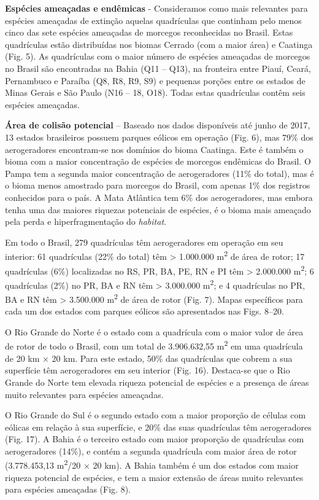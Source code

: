 \documentclass[
]{scrbook}
\begin{document}
\textbf{Espécies ameaçadas e endêmicas} - Consideramos como mais relevantes para espécies ameaçadas de extinção aquelas quadrículas que continham pelo menos cinco das sete espécies ameaçadas de morcegos reconhecidas no Brasil. Estas quadrículas estão distribuídas nos biomas Cerrado (com a maior área) e Caatinga (Fig. 5). As quadrículas com o maior número de espécies ameaçadas de morcegos no Brasil são encontradas na Bahia (Q11 -- Q13), na fronteira entre Piauí, Ceará, Pernambuco e Paraíba (Q8, R8, R9, S9) e pequenas porções entre os estados de Minas Gerais e São Paulo (N16 -- 18, O18). Todas estas quadrículas contêm seis espécies ameaçadas.

\textbf{Área de colisão potencial} -- Baseado nos dados disponíveis até junho de 2017, 13 estados brasileiros possuem parques eólicos em operação (Fig. 6), mas 79\% dos aerogeradores encontram-se nos domínios do bioma Caatinga. Este é também o bioma com a maior concentração de espécies de morcegos endêmicas do Brasil. O Pampa tem a segunda maior concentração de aerogeradores (11\% do total), mas é o bioma menos amostrado para morcegos do Brasil, com apenas 1\% dos registros conhecidos para o país. A Mata Atlântica tem 6\% dos aerogeradores, mas embora tenha uma das maiores riquezas potenciais de espécies, é o bioma mais ameaçado pela perda e hiperfragmentação do \emph{habitat}.

Em todo o Brasil, 279 quadrículas têm aerogeradores em operação em seu interior: 61 quadrículas (22\% do total) têm \textgreater{} 1.000.000 m\textsuperscript{2} de área de rotor; 17 quadrículas (6\%) localizadas no RS, PR, BA, PE, RN e PI têm \textgreater{} 2.000.000 m\textsuperscript{2}; 6 quadrículas (2\%) no PR, BA e RN têm \textgreater{} 3.000.000 m\textsuperscript{2}; e 4 quadrículas no PR, BA e RN têm \textgreater{} 3.500.000 m\textsuperscript{2} de área de rotor (Fig. 7). Mapas específicos para cada um dos estados com parques eólicos são apresentados nas Figs. 8--20.

O Rio Grande do Norte é o estado com a quadrícula com o maior valor de área de rotor de todo o Brasil, com um total de 3.906.632,55 m\textsuperscript{2} em uma quadrícula de 20 km × 20 km. Para este estado, 50\% das quadrículas que cobrem a sua superfície têm aerogeradores em seu interior (Fig. 16). Destaca-se que o Rio Grande do Norte tem elevada riqueza potencial de espécies e a presença de áreas muito relevantes para espécies ameaçadas.

O Rio Grande do Sul é o segundo estado com a maior proporção de células com eólicas em relação à sua superfície, e 20\% das suas quadrículas têm aerogeradores (Fig. 17). A Bahia é o terceiro estado com maior proporção de quadrículas com aerogeradores (14\%), e contém a segunda quadrícula com maior área de rotor (3.778.453,13 m\textsuperscript{2}/20 × 20 km). A Bahia também é um dos estados com maior riqueza potencial de espécies, e tem a maior extensão de áreas muito relevantes para espécies ameaçadas (Fig. 8).
\end{document}
